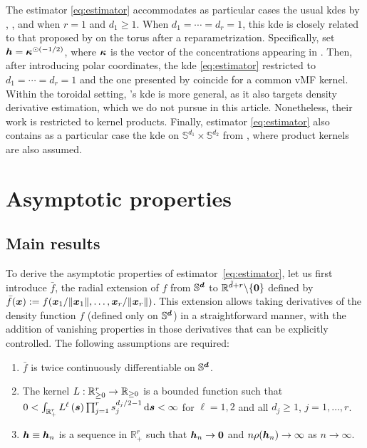 \documentclass[oneside,11pt]{article}
\begin{document}
%
The estimator \eqref{eq:estimator} accommodates as particular cases the usual kdes by \citet[p. 1169]{Beran1979}, \citet[p. 25]{Bai1988}, and \citet[p. 52]{Hall1987} when $r=1$ and $d_1\geq1$. When $d_1=\cdots=d_r=1$, this kde is closely related to that proposed by \citet[p. 2158]{DiMarzio2011} on the torus after a reparametrization. Specifically, set ${\boldsymbol{h}}=\boldsymbol\kappa^{\odot(-1/2)}$, where $\boldsymbol\kappa$ is the vector of the concentrations appearing in \cite{DiMarzio2011}. Then, after introducing polar coordinates, the kde \eqref{eq:estimator} restricted to $d_1=\cdots=d_r=1$ and the one presented by \cite{DiMarzio2011} coincide for a common vMF kernel. Within the toroidal setting, \cite{DiMarzio2011}'s kde is more general, as it also targets density derivative estimation, which we do not pursue in this article. Nonetheless, their work is restricted to kernel products. Finally, estimator \eqref{eq:estimator} also contains as a particular case the kde on $\mathbb{S}^{d_1}\times \mathbb{S}^{d_2}$ from \citet[p. 1210]{Garcia-Portugues2015}, where product kernels are also assumed.

\section{Asymptotic properties}
\label{sec:prop}

\subsection{Main results}
\label{sec:mainres}

To derive the asymptotic properties of estimator~\eqref{eq:estimator}, let us first introduce $\bar{f}$, the radial extension of $f$ from $\mathbb{S}^{\boldsymbol{d}}$ to $\mathbb{R}^{\tilde{d}+r}\backslash\{\mathbf{0}\}$ defined by $\bar{f}(\boldsymbol{x}):= f(\boldsymbol{x}_1/\|\boldsymbol{x}_1\|,\ldots,\boldsymbol{x}_r/\|\boldsymbol{x}_r\|)$. This extension allows taking derivatives of the density function $f$ (defined only on $\mathbb{S}^{\boldsymbol{d}}$) in a straightforward manner, with the addition of vanishing properties in those derivatives that can be explicitly controlled. The following assumptions are required:
\begin{enumerate}[label=\textbf{A\arabic{*}}., ref=\textbf{A\arabic{*}}]
    \item $\bar{f}$ is twice continuously differentiable on $\mathbb{S}^{\boldsymbol{d}}$. \label{A1}
    \item The kernel $L:\mathbb{R}_{\geq 0}^r\to\mathbb{R}_{\geq 0}$ is a bounded function such that $0<\int_{\mathbb{R}_+^r}L^\ell\left(\boldsymbol{s}\right) \prod_{j=1}^r s_j^{d_j/2-1}\,\mathrm{d} \boldsymbol{s}<\infty$ for $\ell=1,2$ and all $d_j\geq 1$, $j=1,\ldots,r$. \label{A2}
    \item ${\boldsymbol{h}}\equiv{\boldsymbol{h}}_n$ is a sequence in $\mathbb{R}_+^r$ such that ${\boldsymbol{h}}_n\to\mathbf{0}$ and $n\rho({\boldsymbol{h}}_n) \to\infty$ as $n\to\infty$. \label{A3}
\end{enumerate}
\end{document}
